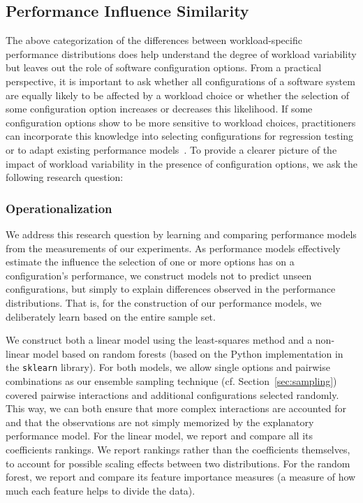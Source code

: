 

\subsection{Performance Influence Similarity}
The above categorization of the differences between workload-specific performance distributions does help understand the degree of workload variability but leaves out the role of software configuration options. From a practical perspective, it is important to ask whether all configurations of a software system are equally likely to be affected by a workload choice or whether the selection of some configuration option increases or decreases this likelihood. If some configuration options show to be more sensitive to workload choices, practitioners can incorporate this knowledge into selecting configurations for regression testing or to adapt existing performance models~\cite{jamshidi_learning_2018}. To provide a clearer picture of the impact of workload variability in the presence of configuration options, we ask the following research question:


\subsubsection{Operationalization}
We address this research question by learning and comparing performance models from the measurements of our experiments. As performance models effectively estimate the influence the selection of one or more options has on a configuration’s performance, we construct models not to predict unseen configurations, but simply to explain differences observed in the performance distributions. That is, for the construction of our performance models, we deliberately learn based on the entire sample set.

We construct both a linear model using the least-squares method and a non-linear model based on random forests (based on the Python implementation in the \texttt{sklearn} library). For both models, we allow single options and pairwise combinations as our ensemble sampling technique (cf. Section~\ref{sec:sampling}) covered pairwise interactions and additional configurations selected randomly. This way, we can both ensure that more complex interactions are accounted for and that the observations are not simply memorized by the explanatory performance model. For the linear model, we report and compare all its coefficients rankings. We report rankings rather than the coefficients themselves, to account for possible scaling effects between two distributions. For the random forest, we report and compare its feature importance measures (a measure of how much each feature helps to divide the data). 

